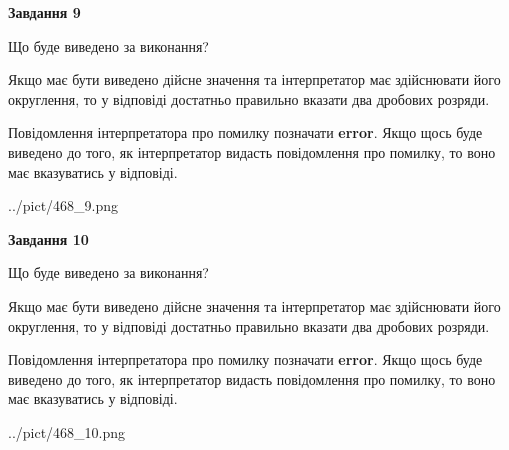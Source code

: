 \documentclass[12pt, ukrainian]{article}
\begin{document}
{\begin {Large}
{\begin {center}\textbf{Завдання 9}\end {center}}\par
Що буде виведено за виконання? \par

Якщо має бути виведено дійсне значення та інтерпретатор має здійснювати його округлення, 
то у відповіді достатньо правильно вказати два дробових розряди.

Повідомлення інтерпретатора про помилку позначати \textbf{error}.
Якщо щось буде виведено до того, як інтерпретатор видасть повідомлення про помилку, 
то воно має вказуватись у відповіді. \par

\begin{center}
	{../pict/468_9.png}
\end{center}
\newpage

{\begin {center}\textbf{Завдання 10}\end {center}}\par
Що буде виведено за виконання? \par

Якщо має бути виведено дійсне значення та інтерпретатор має здійснювати його округлення, 
то у відповіді достатньо правильно вказати два дробових розряди.

Повідомлення інтерпретатора про помилку позначати \textbf{error}.
Якщо щось буде виведено до того, як інтерпретатор видасть повідомлення про помилку, 
то воно має вказуватись у відповіді. \par

\begin{center}
	{../pict/468_10.png}
\end{center}
\newpage

\end {Large}}
\end{document}
